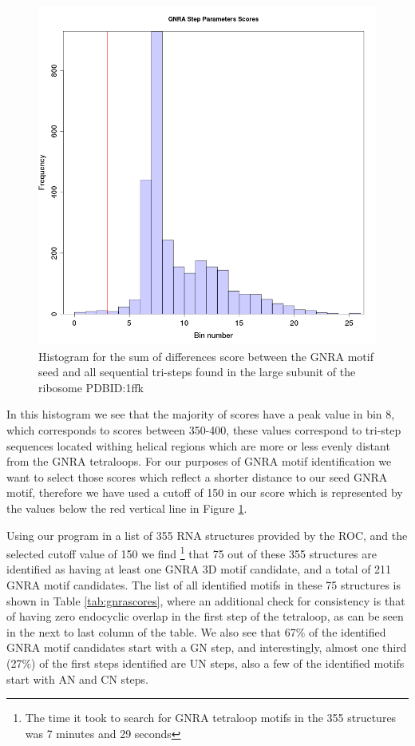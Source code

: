 \begin{figure}
\centering 
\includegraphics[angle=0, scale=0.5]{Chapter5/gnrahisto.png}
\caption{Histogram for  the sum of differences score  between the GNRA
  motif seed and  all sequential tri-steps found in  the large subunit
  of the ribosome PDBID:1ffk}
\label{fig:gnrahist}
\end{figure}

In this histogram we see that the majority of scores have a peak value
in bin 8,  which corresponds to scores between  350-400, these values
correspond to tri-step sequences located withing helical regions which
are  more or less  evenly distant  from the  GNRA tetraloops.  For our
purposes of GNRA  motif identification we want to  select those scores
which reflect a shorter distance  to our seed GNRA motif, therefore we
have used  a cutoff of  150 in our  score which is represented  by the
values below the red vertical line in Figure \ref{fig:gnrahist}.

Using our program in a list of 355 RNA structures provided by the ROC,
and the  selected cutoff  value of 150  we find \footnote{The  time it
  took to search for GNRA tetraloop motifs in the 355 structures was 7
  minutes  and 29 seconds}  that 75  out of  these 355  structures are
identified as having at least one GNRA 3D motif candidate, and a total
of 211  GNRA motif candidates.  The  list of all  identified motifs in
these 75  structures is shown in Table  \ref{tab:gnrascores}, where an
additional  check for consistency  is that  of having  zero endocyclic
overlap in the first step of the tetraloop, as can be seen in the next
to last column of the table.   We also see that 67\% of the identified
GNRA motif candidates start with  a GN step, and interestingly, almost
one third  (27\%) of the first  steps identified are UN  steps, also a
few of the identified motifs start with AN and CN steps.

